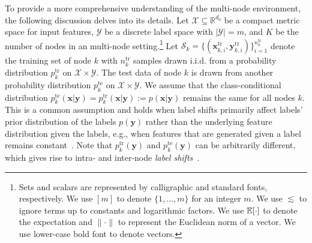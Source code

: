 To provide a more comprehensive understanding of the multi-node environment, the following discussion delves into its details.
Let $\mathcal{X}\subseteq \mathbb{R}^{d_0}$ be a compact metric space for input features, $\mathcal{Y}$ be a discrete label space with $|\mathcal{Y}|=m$, and $K$ be the number of nodes in an multi-node setting.\footnote{Sets and scalars are represented by calligraphic and standard fonts, respectively. We use $[m]$ to denote $\{1,\ldots,m\}$ for an integer $m$. We use $\lesssim$ to ignore terms up to constants and logarithmic factors. We use $\mathbb{E}[\cdot]$ to denote the expectation and $\|\cdot\|$ to represent the Euclidean norm of a vector. We use lower-case bold font to denote vectors.} 
Let $\mathcal{S}_k=\{(\boldsymbol{x}_{k,i}^{\text{tr}},{\boldsymbol{y}}_{k,i}^{\text{tr}})\}_{i=1}^{n_k^{\text{tr}}}$ denote the training set of node $k$ with $n_k^{\text{tr}}$ samples drawn i.i.d. from a probability distribution $p_k^{\text{tr}}$ on $\mathcal{X} \times \mathcal{Y}$.
The test data of node $k$ is drawn from another probability distribution $p_k^{\text{te}}$ on $\mathcal{X} \times \mathcal{Y}$. We assume that the class-conditional distribution $p_k^{\text{te}}(\boldsymbol{x}|\boldsymbol{y})=p_k^{\text{tr}}(\boldsymbol{x}|\boldsymbol{y}) := p(\boldsymbol{x}|\boldsymbol{y})$ remains the same for all nodes $k$. This is a common assumption and holds when label shifts primarily affect labels' prior distribution of the labels $p(\boldsymbol{y})$ rather than the underlying feature distribution given the labels, e.g., when features that are generated given a label remains constant~\citep{zadrozny2004learning,huang2006correcting,sugiyama2007covariate}. 
Note that $p_k^{\text{tr}}(\boldsymbol{y})$ and $p_k^{\text{te}}(\boldsymbol{y})$ can be arbitrarily different, which gives rise to intra- and inter-node \emph{label shifts}~\citep{zadrozny2004learning,huang2006correcting,sugiyama2007covariate,rls}.


